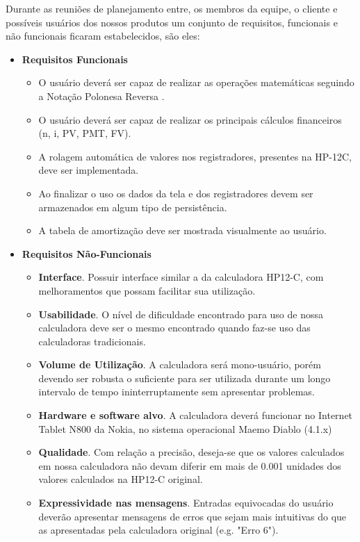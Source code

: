 Durante as reuniões de planejamento entre, os membros da equipe, o cliente e possíveis usuários dos nossos produtos um conjunto de requisitos, funcionais e não funcionais ficaram estabelecidos, são eles:
\begin{itemize}
 \item \textbf{Requisitos Funcionais}
	\begin{itemize}
 	\item O usuário deverá ser capaz de realizar as operações matemáticas seguindo a Notação Polonesa Reversa \cite{NPR}.
	\item O usuário deverá ser capaz de realizar os principais cálculos financeiros (n, i, PV, PMT, FV).
	\item A rolagem automática de valores nos registradores, presentes na HP-12C, deve ser implementada.
	\item Ao finalizar o uso os dados da tela e dos registradores devem ser armazenados em algum tipo de persistência.
	\item A tabela de amortização deve ser mostrada visualmente ao usuário.
	\end{itemize}
 \item \textbf{Requisitos Não-Funcionais}
	\begin{itemize}
	 \item \textbf{Interface}. Possuir interface similar a da calculadora HP12-C, com melhoramentos que possam facilitar sua utilização.
	 \item \textbf{Usabilidade}. O nível de dificuldade encontrado para uso de nossa calculadora deve ser o mesmo encontrado quando faz-se uso das calculadoras tradicionais.
	 \item \textbf{Volume de Utilização}. A calculadora será mono-usuário, porém devendo ser robusta o suficiente para ser utilizada durante um longo intervalo de tempo ininterruptamente sem apresentar problemas.
	 \item \textbf{Hardware e software alvo}. A calculadora deverá funcionar no Internet Tablet N800 da Nokia, no sistema operacional Maemo Diablo (4.1.x) 
	 \item \textbf{Qualidade}. Com relação a precisão, deseja-se que os valores calculados em nossa calculadora não devam diferir em mais de 0.001 unidades dos valores calculados na HP12-C original.
	 \item \textbf{Expressividade nas mensagens}. Entradas equivocadas do usuário deverão apresentar mensagens de erros que sejam mais intuitivas do que as apresentadas pela calculadora original (e.g. "Erro 6").

\end{itemize}
\end{itemize}
